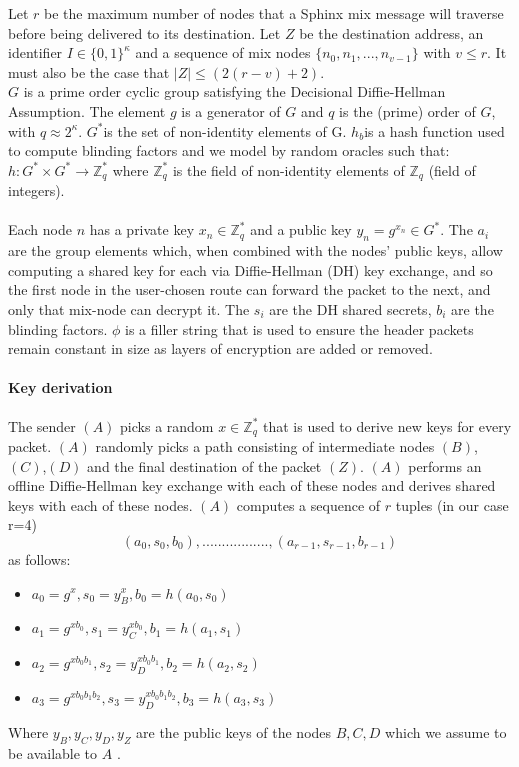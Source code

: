 Let $r$ be the maximum number of nodes that a Sphinx mix message will traverse before being delivered to its destination. Let $Z$ be  the destination address, an identifier $I \in \{0, 1\}^\kappa$ and a sequence of mix nodes $\{n_0, n_1, . . . , n_{v-1}\}$ with $v\leq r$. It must also be the case that $|Z| \leq (2(r - v) + 2)$.
\\$G$ is a prime order cyclic group satisfying the Decisional Diffie-Hellman Assumption. The element $g$ is a generator of $G$ and $q$ is the (prime) order of $G$, with $q\approx2^{\kappa}$.
$G^*$is the set of non-identity elements of G. $h_b$is a hash function used to compute blinding factors and we model by random oracles such that:
$h:G^*\times G^*\rightarrow\mathbb{Z}^*_q$ where $\mathbb{Z}^*_q$ is the field of non-identity elements of $\mathbb{Z}_q$ (field of integers).
\\~\\Each node $n$ has a private key $x_n\in \mathbb{Z}^*_q$ and a public key $y_n=g^{x_n}\in G^*$.
The $a_i$ are the group elements which, when combined with the nodes’ public keys, allow computing a shared key for each via Diffie-Hellman (DH) key exchange, and so the first node in the user-chosen route can forward the packet to the next, and only that mix-node can decrypt it.
The $s_i$ are the DH shared secrets, $b_i$ are the blinding factors. $\phi$ is a filler string that is used to ensure the header packets remain constant in size as layers of encryption are added or removed. 

\paragraph{Key derivation}
The sender $(A)$ picks a random $x\in \mathbb{Z}^*_q$ that is used to derive new keys for every packet. 
\newline $(A)$ randomly picks a path consisting of intermediate nodes $(B)$, $(C)$,$(D)$ and the final destination of the packet $(Z)$. 
\newline $(A)$ performs an offline Diffie-Hellman key exchange with each of these nodes and derives shared keys with each of these nodes.
\newline $(A)$ computes a sequence of $r$ tuples (in our case r=4)  $$(a_0,s_0,b_0),.................,(a_{r-1},s_{r-1},b_{r-1})$$ as follows:
\begin{itemize}
\item $a_0=g^x,s_0=y^x_B,b_0=h(a_0,s_0)$
\item $a_1=g^{xb_0},s_1=y^{xb_0}_C,b_1=h(a_1,s_1)$
\item $a_2=g^{xb_0b_1},s_2=y^{xb_0b_1}_D,b_2=h(a_2,s_2)$
\item $a_3=g^{xb_0b_1b_2},s_3=y^{xb_0b_1b_2}_D,b_3=h(a_3,s_3)$
\end{itemize}
 Where $y_B,y_C,y_D,y_Z$ are the public keys of the nodes $B,C, D$  which we assume to be available to $A$ .

